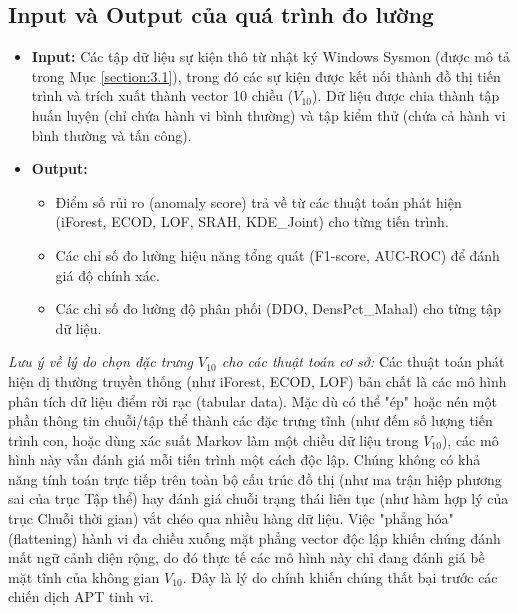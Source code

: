 \documentclass[../main.tex]{subfiles}
\begin{document}
\subsection{Input và Output của quá trình đo lường}
\begin{itemize}
    \item \textbf{Input:} Các tập dữ liệu sự kiện thô từ nhật ký Windows Sysmon (được mô tả trong Mục \ref{section:3.1}), trong đó các sự kiện được kết nối thành đồ thị tiến trình và trích xuất thành vector 10 chiều ($V_{10}$). Dữ liệu được chia thành tập huấn luyện (chỉ chứa hành vi bình thường) và tập kiểm thử (chứa cả hành vi bình thường và tấn công).
    \item \textbf{Output:} 
    \begin{itemize}
        \item Điểm số rủi ro (anomaly score) trả về từ các thuật toán phát hiện (iForest, ECOD, LOF, SRAH, KDE\_Joint) cho từng tiến trình.
        \item Các chỉ số đo lường hiệu năng tổng quát (F1-score, AUC-ROC) để đánh giá độ chính xác.
        \item Các chỉ số đo lường độ phân phối (DDO, DensPct\_Mahal) cho từng tập dữ liệu.
    \end{itemize}
\end{itemize}

\textit{Lưu ý về lý do chọn đặc trưng $V_{10}$ cho các thuật toán cơ sở:} Các thuật toán phát hiện dị thường truyền thống (như iForest, ECOD, LOF) bản chất là các mô hình phân tích dữ liệu điểm rời rạc (tabular data). Mặc dù có thể "ép" hoặc nén một phần thông tin chuỗi/tập thể thành các đặc trưng tĩnh (như đếm số lượng tiến trình con, hoặc dùng xác suất Markov làm một chiều dữ liệu trong $V_{10}$), các mô hình này vẫn đánh giá mỗi tiến trình một cách độc lập. Chúng không có khả năng tính toán trực tiếp trên toàn bộ cấu trúc đồ thị (như ma trận hiệp phương sai của trục Tập thể) hay đánh giá chuỗi trạng thái liên tục (như hàm hợp lý của trục Chuỗi thời gian) vắt chéo qua nhiều hàng dữ liệu. Việc "phẳng hóa" (flattening) hành vi đa chiều xuống mặt phẳng vector độc lập khiến chúng đánh mất ngữ cảnh diện rộng, do đó thực tế các mô hình này chỉ đang đánh giá bề mặt tĩnh của không gian $V_{10}$. Đây là lý do chính khiến chúng thất bại trước các chiến dịch APT tinh vi.
\end{document}
